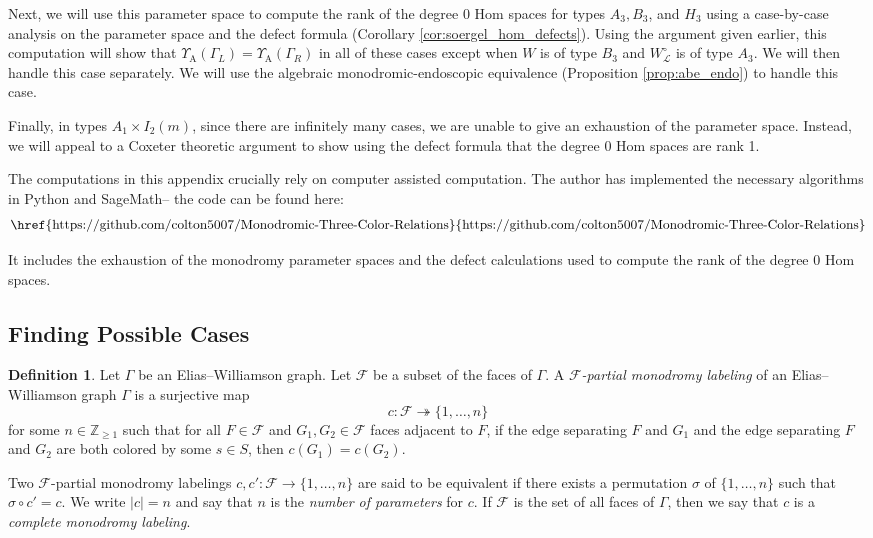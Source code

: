 \documentclass{amsart}
\newcommand{\Z}{\mathbb{Z}}
\newcommand{\scrF}{\mathcal{F}}
\newcommand{\scrL}{\mathcal{L}}
\DeclareMathOperator{\Abe}{A}
\newcommand{\abs}[1]{\lvert #1 \rvert}
\theoremstyle{definition}
\newtheorem{definition}[subsubsection]{Definition}
\numberwithin{equation}{subsection}
\begin{document}
Next, we will use this parameter space to compute the rank of the degree 0 Hom spaces for types $A_3, B_3$, and $H_3$ using a case-by-case analysis on the parameter space and the defect formula (Corollary \ref{cor:soergel_hom_defects}).
Using the argument given earlier, this computation will show that $\Upsilon_{\Abe} (\Gamma_L) = \Upsilon_{\Abe} (\Gamma_R)$ in all of these cases except when $W$ is of type $B_3$ and $W_{\scrL}^{\circ}$ is of type $A_3$.
We will then handle this case separately. We will use the algebraic monodromic-endoscopic equivalence (Proposition \ref{prop:abe_endo}) to handle this case.

Finally, in types $A_1 \times I_2 (m)$, since there are infinitely many cases, we are unable to give an exhaustion of the parameter space. Instead, we will appeal to a Coxeter theoretic argument to show using the defect formula that the degree 0 Hom spaces are rank 1.  

The computations in this appendix crucially rely on computer assisted computation. The author has implemented the necessary algorithms in Python and SageMath-- the code can be found here: 
\begin{equation}\label{eq:github}
    \textnormal{\href{https://github.com/colton5007/Monodromic-Three-Color-Relations}{https://github.com/colton5007/Monodromic-Three-Color-Relations}}
\end{equation}

\noindent It includes the exhaustion of the monodromy parameter spaces and the defect calculations used to compute the rank of the degree 0 Hom spaces.

\subsection{Finding Possible Cases}

\begin{definition}
    Let $\Gamma$ be an Elias--Williamson graph.
    Let $\scrF$ be a subset of the faces of $\Gamma$.
    A \emph{$\scrF$-partial monodromy labeling} of an Elias--Williamson graph $\Gamma$ is a surjective map
    \[c : \scrF \twoheadrightarrow \{1 , \ldots, n\}\]
    for some $n \in \Z_{\geq 1}$ such that for all $F \in \scrF$ and $G_1, G_2 \in \scrF$ faces adjacent to $F$, if the edge separating $F$ and $G_1$ and the edge separating $F$ and $G_2$ are both colored by some $s \in S$, then $c (G_1) = c(G_2)$.

    Two $\scrF$-partial monodromy labelings $c, c' : \scrF \to \{1, \ldots, n\}$ are said to be equivalent if there exists a permutation $\sigma$ of $\{1, \ldots, n\}$ such that $\sigma \circ c' = c$. 
    We write $\abs{c} = n$ and say that $n$ is the \emph{number of parameters} for $c$.
    If $\scrF$ is the set of all faces of $\Gamma$, then we say that $c$ is a \emph{complete monodromy labeling}.
\end{definition}
\end{document}
